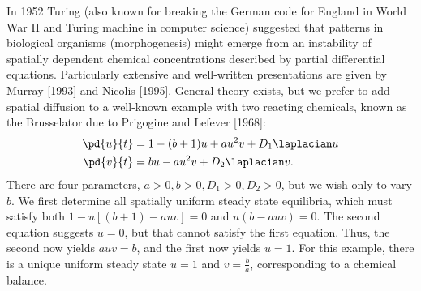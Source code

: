 In 1952 Turing (also known for breaking the German code for England in World War II and Turing machine in computer science) suggested that patterns in biological organisms (morphogenesis) might emerge from an instability of spatially dependent chemical concentrations described by partial differential equations. Particularly extensive and well-written presentations are given by Murray [1993] and Nicolis [1995]. General theory exists, but we prefer to add spatial diffusion to a well-known example with two reacting chemicals, known as the Brusselator due to Prigogine and Lefever [1968]:
\begin{align}
\pd{u}{t} &= 1 - (b+1)u + au^2v + D_1\laplacian u \label{eq:14.8.54} \\
\pd{v}{t} &= bu - au^2v + D_2\laplacian v. \label{eq:14.8.55}
\end{align}
There are four parameters, $a > 0, b > 0, D_1 > 0, D_2 > 0$, but we wish only to vary $b$. We first determine all spatially uniform steady state equilibria, which must satisfy both $1 - u[(b+1) - auv] = 0$ and $u(b - auv) = 0$. The second equation suggests $u = 0$, but that cannot satisfy the first equation. Thus, the second now yields $auv = b$, and the first now yields $u = 1$. For this example, there is a unique uniform steady state $u = 1$ and $v = \frac{b}{a}$, corresponding to a chemical balance.

